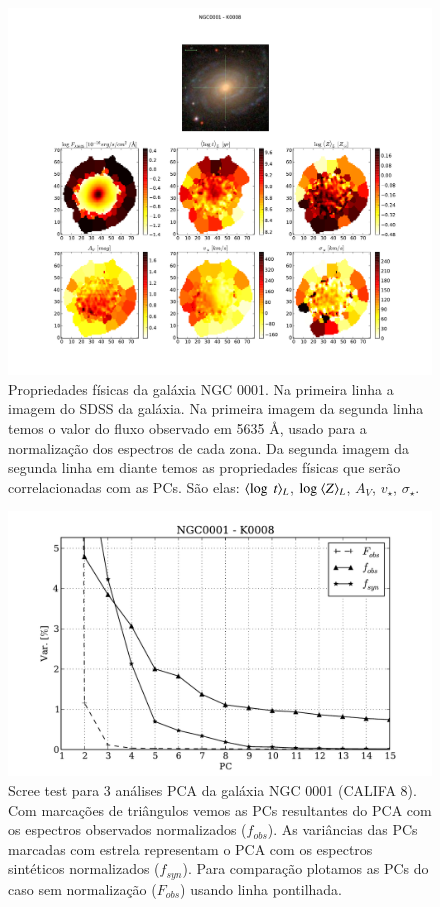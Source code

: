 \begin{figure}
    \includegraphics[width=1.\textwidth]{figuras/K0008-apresent.pdf}
    \caption[Propriedades f\'isicas da gal\'axia NGC 0001.]
    {Propriedades físicas da galáxia NGC 0001. Na primeira linha a imagem do SDSS da galáxia. Na primeira imagem da
    segunda linha temos o valor do fluxo observado em 5635 \AA, usado para a normalização dos espectros de cada zona. Da
    segunda imagem da segunda linha em diante temos as propriedades físicas que serão correlacionadas com as PCs. São
    elas: $\meanL{\log\ t}$, $\log\ \meanL{Z}$, $A_V$, $v_{\star}$, $\sigma_{\star}$.}
    \label{fig:K0008apresent}
\end{figure}

\begin{figure}
    \includegraphics[height=0.33\textheight]{figuras/K0008-screetest.pdf}
    \caption[Scree test comparativo entre 3 PCAs - NGC 0001.]
    {Scree test para 3 análises PCA da galáxia NGC 0001 (CALIFA 8). Com marcações de triângulos vemos as PCs resultantes
    do PCA com os espectros observados normalizados ($f_{obs}$). As variâncias das PCs marcadas com estrela
    representam o PCA com os espectros sintéticos normalizados ($f_{syn}$). Para comparação plotamos as PCs do
    caso sem normalização ($F_{obs}$) usando linha pontilhada.}
    \label{fig:K0008scree}
\end{figure}

